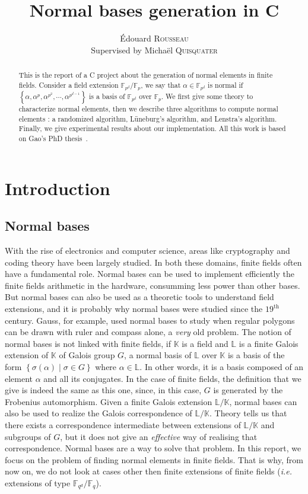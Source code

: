 \documentclass[a4paper,11pt]{article}
\title{Normal bases generation in C}
\author{Édouard \textsc{Rousseau}\\Supervised by Michaël \textsc{Quisquater}}
\theoremstyle{break}
\theoremstyle{sc}
\theoremstyle{definition}
\theoremstyle{remark}
\newcommand{\ie}{\emph{i.e. }}
\begin{document}
\maketitle

\begin{abstract}
  This is the report of a C project about the generation of normal elements in
  finite fields. Consider a field extension $\mathbb{F}_{p^d}/\mathbb{F}_p$, we
  say that $\alpha\in\mathbb{F}_{p^d}$ is normal if $\left\{
  \alpha,\alpha^p,\alpha^{p^2},\cdots,\alpha^{p^{d-1}} \right\}$ is a basis of
  $\mathbb{F}_{p^d}$ over $\mathbb{F}_p$. We first give some theory to
  characterize normal elements, then we describe three algorithms to compute
  normal elements : a randomized algorithm, Lüneburg's algorithm, and
  Lenstra's algorithm. Finally, we give experimental results about our
  implementation. All this work is based on Gao's PhD thesis~\cite{Ga93}.

\end{abstract}

\tableofcontents

\clearpage

\section{Introduction}
\subsection{Normal bases}
With the rise of electronics and computer science, areas like
cryptography and coding theory have been largely studied. In both these
domains, finite fields often have a fundamental role. Normal bases can be
used to implement efficiently the finite fields arithmetic in the hardware,
consumming less power than other bases. But normal bases can also be used as a
theoretic tools to understand field extensions, and it is probably why normal bases were
studied since the $19^\textrm{th}$ century. Gauss, for example, used normal
bases to study when regular polygons can be drawn with ruler and compass
alone, a \emph{very} old problem. The notion of normal bases is not linked
with finite fields, if $\mathbb{K}$ is a field and $\mathbb{L}$ is a finite
Galois extension of $\mathbb{K}$ of Galois group $G$, a normal basis of
$\mathbb{L}$ over $\mathbb{K}$ is a basis of the form $\left\{
  \sigma(\alpha)\;|\;\sigma\in G
\right\}$ where $\alpha\in\mathbb{L}$. In other words, it is a basis composed
of an element $\alpha$ and all its conjugates. In the case of finite fields,
the definition that we give is indeed the same as this one, since, in this case,
$G$ is generated by the Frobenius automorphism. Given a finite Galois extension
$\mathbb{L}/\mathbb{K}$, normal bases can also be used to realize the Galois
correspondence of $\mathbb{L}/\mathbb{K}$. Theory tells us that there exists a
correspondence intermediate between extensions of $\mathbb{L}/\mathbb{K}$ and subgroups
of $G$, but it does not give an \emph{effective} way of realising that
correspondence. Normal bases are a way to solve that problem. In this report, we
focus on the problem of finding normal elements in finite fields. That is
why, from now on, we do not look at cases other then finite extensions
of finite fields (\ie extensions of type
$\mathbb{F}_{q^d}/\mathbb{F}_q$).
\end{document}
